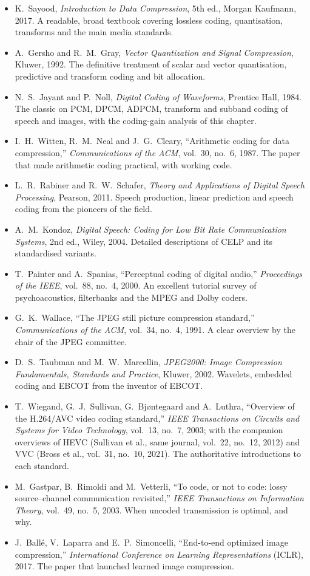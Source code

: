 \furtherreading
\begin{itemize}
\item K.~Sayood, \emph{Introduction to Data Compression}, 5th ed., Morgan Kaufmann, 2017. A readable, broad
textbook covering lossless coding, quantisation, transforms and the main media standards.
\item A.~Gersho and R.~M.~Gray, \emph{Vector Quantization and Signal Compression}, Kluwer, 1992. The
definitive treatment of scalar and vector quantisation, predictive and transform coding and bit allocation.
\item N.~S.~Jayant and P.~Noll, \emph{Digital Coding of Waveforms}, Prentice Hall, 1984. The classic on PCM,
DPCM, ADPCM, transform and subband coding of speech and images, with the coding-gain analysis of this chapter.
\item I.~H.~Witten, R.~M.~Neal and J.~G.~Cleary, ``Arithmetic coding for data compression,''
\emph{Communications of the ACM}, vol.~30, no.~6, 1987. The paper that made arithmetic coding practical, with
working code.
\item L.~R.~Rabiner and R.~W.~Schafer, \emph{Theory and Applications of Digital Speech Processing}, Pearson,
2011. Speech production, linear prediction and speech coding from the pioneers of the field.
\item A.~M.~Kondoz, \emph{Digital Speech: Coding for Low Bit Rate Communication Systems}, 2nd ed., Wiley,
2004. Detailed descriptions of CELP and its standardised variants.
\item T.~Painter and A.~Spanias, ``Perceptual coding of digital audio,'' \emph{Proceedings of the IEEE},
vol.~88, no.~4, 2000. An excellent tutorial survey of psychoacoustics, filterbanks and the MPEG and Dolby
coders.
\item G.~K.~Wallace, ``The JPEG still picture compression standard,'' \emph{Communications of the ACM},
vol.~34, no.~4, 1991. A clear overview by the chair of the JPEG committee.
\item D.~S.~Taubman and M.~W.~Marcellin, \emph{JPEG2000: Image Compression Fundamentals, Standards and
Practice}, Kluwer, 2002. Wavelets, embedded coding and EBCOT from the inventor of EBCOT.
\item T.~Wiegand, G.~J.~Sullivan, G.~Bj{\o}ntegaard and A.~Luthra, ``Overview of the H.264/AVC video coding
standard,'' \emph{IEEE Transactions on Circuits and Systems for Video Technology}, vol.~13, no.~7, 2003; with
the companion overviews of HEVC (Sullivan et al., same journal, vol.~22, no.~12, 2012) and VVC (Bross et al.,
vol.~31, no.~10, 2021). The authoritative introductions to each standard.
\item M.~Gastpar, B.~Rimoldi and M.~Vetterli, ``To code, or not to code: lossy source--channel communication
revisited,'' \emph{IEEE Transactions on Information Theory}, vol.~49, no.~5, 2003. When uncoded transmission is
optimal, and why.
\item J.~Ball\'e, V.~Laparra and E.~P.~Simoncelli, ``End-to-end optimized image compression,''
\emph{International Conference on Learning Representations} (ICLR), 2017. The paper that launched learned image
compression.
\end{itemize}
